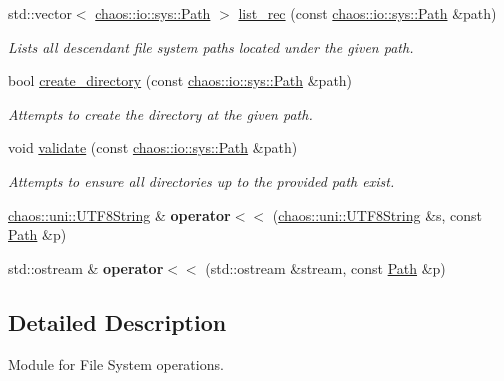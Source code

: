 \begin{DoxyCompactItemize}
std\-::vector$<$ \hyperlink{classchaos_1_1io_1_1sys_1_1_path}{chaos\-::io\-::sys\-::\-Path} $>$ \hyperlink{namespacechaos_1_1io_1_1sys_a956856df76f476b3300ab1ebe733e2a7}{list\-\_\-rec} (const \hyperlink{classchaos_1_1io_1_1sys_1_1_path}{chaos\-::io\-::sys\-::\-Path} \&path)
\begin{DoxyCompactList}\small\item\em Lists all descendant file system paths located under the given path. \end{DoxyCompactList}\item 
bool \hyperlink{namespacechaos_1_1io_1_1sys_a6bcdadf916b110395f4a2627c049da11}{create\-\_\-directory} (const \hyperlink{classchaos_1_1io_1_1sys_1_1_path}{chaos\-::io\-::sys\-::\-Path} \&path)
\begin{DoxyCompactList}\small\item\em Attempts to create the directory at the given path. \end{DoxyCompactList}\item 
void \hyperlink{namespacechaos_1_1io_1_1sys_a15e20b105c40cf4d73b13afe87ce1781}{validate} (const \hyperlink{classchaos_1_1io_1_1sys_1_1_path}{chaos\-::io\-::sys\-::\-Path} \&path)
\begin{DoxyCompactList}\small\item\em Attempts to ensure all directories up to the provided path exist. \end{DoxyCompactList}\item 
\hypertarget{namespacechaos_1_1io_1_1sys_a669178b3843d1716570b4b5ca8fd417d}{\hyperlink{classchaos_1_1uni_1_1_u_t_f8_string}{chaos\-::uni\-::\-U\-T\-F8\-String} \& {\bfseries operator$<$$<$} (\hyperlink{classchaos_1_1uni_1_1_u_t_f8_string}{chaos\-::uni\-::\-U\-T\-F8\-String} \&s, const \hyperlink{classchaos_1_1io_1_1sys_1_1_path}{Path} \&p)}\label{namespacechaos_1_1io_1_1sys_a669178b3843d1716570b4b5ca8fd417d}

\item 
\hypertarget{namespacechaos_1_1io_1_1sys_aa28fa69e8966c0ff55c3b59cdff9cebc}{std\-::ostream \& {\bfseries operator$<$$<$} (std\-::ostream \&stream, const \hyperlink{classchaos_1_1io_1_1sys_1_1_path}{Path} \&p)}\label{namespacechaos_1_1io_1_1sys_aa28fa69e8966c0ff55c3b59cdff9cebc}

\end{DoxyCompactItemize}


\subsection{Detailed Description}
Module for File System operations. 

